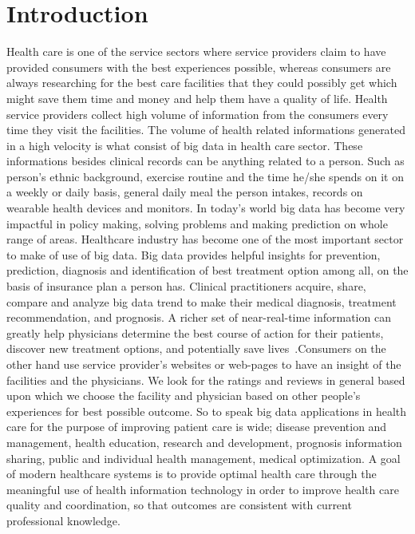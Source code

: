 \documentclass[sigconf]{acmart}
\begin{document}
\section{Introduction}
Health care is one of the service sectors where service providers claim to have provided consumers with the best 
experiences possible, whereas consumers are always researching for the best care facilities that they could possibly get 
which might save them time and money and help them have a quality of life. Health service providers collect high volume of 
information from the consumers every time they visit the facilities. The volume of health related informations generated in a 
high velocity is what consist of big data in health care sector.
These informations besides clinical records can be anything related to a person. Such as  person's ethnic background, exercise routine
and the time he/she spends on it on a weekly or daily basis, general daily meal the person intakes, records on wearable health devices 
and monitors. In today's world big data has become very impactful in policy making, solving problems and making prediction on 
whole range 
of areas. Healthcare industry has become one of the most important sector to make of use of big data. Big data provides helpful insights 
for prevention, prediction, diagnosis and identification of best treatment option among all, on the basis of insurance plan a person 
has. Clinical practitioners acquire, share, compare and analyze big data trend to make their medical diagnosis, treatment
recommendation, and prognosis. A richer set of near-real-time information can greatly help
physicians determine the best course of action for their patients, discover new treatment
options, and potentially save lives~\cite{www-hpe}.Consumers on the other hand use service provider's websites or web-pages to 
have an insight of the facilities and the physicians.
We look for the ratings and reviews in general based upon which we choose the facility and physician based on other people's 
experiences for best possible outcome.  So to speak  big data applications in health care for the purpose of
improving patient care is wide; disease prevention and management, health education, research and development, prognosis  
information sharing, public and individual health management, medical optimization. A goal of modern healthcare systems is 
to provide optimal health care through the meaningful use of health information technology in order to improve health care 
quality and coordination, so that outcomes are consistent with current professional knowledge\cite{www-mapr-com}.
\end{document}
